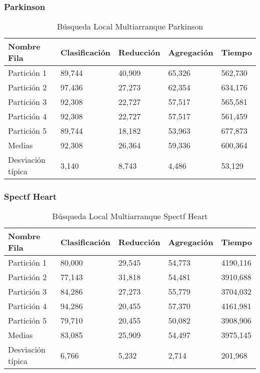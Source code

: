 \subsubsection{Parkinson}
\begin{table}[!ht]
    \centering
    \caption{Búsqueda Local Multiarranque Parkinson}
    \begin{tabular}{|l|l|l|l|l|}
    \hline
        Nombre Fila & Clasificación & Reducción & Agregación & Tiempo \\ \hline
        Partición 1 & 89,744 & 40,909 & 65,326 & 562,730 \\ \hline
        Partición 2 & 97,436 & 27,273 & 62,354 & 634,176 \\ \hline
        Partición 3 & 92,308 & 22,727 & 57,517 & 565,581 \\ \hline
        Partición 4 & 92,308 & 22,727 & 57,517 & 561,459 \\ \hline
        Partición 5 & 89,744 & 18,182 & 53,963 & 677,873 \\ \hline
        Medias  & 92,308 & 26,364 & 59,336 & 600,364 \\ \hline
        Desviación típica & 3,140 & 8,743 & 4,486 & 53,129 \\ \hline
    \end{tabular}
    \label{BLB-Parkinson}
\end{table}


\subsubsection{Spectf Heart}

\begin{table}[!ht]
    \centering
    \caption{Búsqueda Local Multiarranque Spectf Heart}
    \begin{tabular}{|l|l|l|l|l|}
    \hline
        Nombre Fila & Clasificación & Reducción & Agregación & Tiempo \\ \hline
        Partición 1 & 80,000 & 29,545 & 54,773 & 4190,116 \\ \hline
        Partición 2 & 77,143 & 31,818 & 54,481 & 3910,688 \\ \hline
        Partición 3 & 84,286 & 27,273 & 55,779 & 3704,032 \\ \hline
        Partición 4 & 94,286 & 20,455 & 57,370 & 4161,981 \\ \hline
        Partición 5 & 79,710 & 20,455 & 50,082 & 3908,906 \\ \hline
        Medias  & 83,085 & 25,909 & 54,497 & 3975,145 \\ \hline
        Desviación típica & 6,766 & 5,232 & 2,714 & 201,968 \\ \hline
    \end{tabular}
    \label{BLB-hert}
\end{table}

